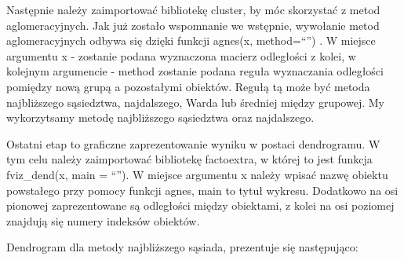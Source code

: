 \documentclass[12pt,a4paper]{report}
\begin{document}
{\begin{Shaded}
\begin{Highlighting}[]
\StringTok{ }\NormalTok{(dane_porzadkowanie[,}\NormalTok{(}\NormalTok{,}\NormalTok{,}
            \NormalTok{,}\NormalTok{,}\NormalTok{)],                                           } \NormalTok{)}
\end{Highlighting}
\end{Shaded}

Następnie należy zaimportować bibliotekę cluster, by móc skorzystać z
metod aglomeracyjnych. Jak już zostało wspomnanie we wstępnie, wywołanie
metod aglomeracyjnych odbywa się dzięki funkcji agnes(x, method=``'') .
W miejsce argumentu x - zostanie podana wyznaczona macierz odległości z
kolei, w kolejnym argumencie - method zostanie podana reguła wyznaczania
odległości pomiędzy nową grupą a pozostałymi obiektów. Regułą tą może
być metoda najbliższego sąsiedztwa, najdalszego, Warda lub średniej
między grupowej. My wykorzytsamy metodę najbliższego sąsiedztwa oraz
najdalszego.

\begin{Shaded}
\begin{Highlighting}[]
\StringTok{ } \NormalTok{)}
\StringTok{ } \NormalTok{)}
\end{Highlighting}
\end{Shaded}

Ostatni etap to graficzne zaprezentowanie wyniku w postaci dendrogramu.
W tym celu należy zaimportować bibliotekę factoextra, w której to jest
funkcja fviz\_dend(x, main = ``''). W miejsce argumentu x należy wpisać
nazwę obiektu powstałego przy pomocy funkcji agnes, main to tytuł
wykresu. Dodatkowo na osi pionowej zaprezentowane są odległości między
obiektami, z kolei na osi poziomej znajdują się numery indeksów
obiektów.

Dendrogram dla metody najbliższego sąsiada, prezentuje się następująco:

\begin{Shaded}
\begin{Highlighting}[]
\NormalTok{, }\NormalTok{, }
 \NormalTok{)}
\end{Highlighting}
\end{Shaded}

}
\end{document}
